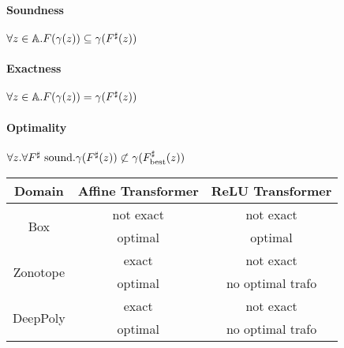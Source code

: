 \paragraph{Soundness} 
$\forall z \in \mathbb{A} . F(\gamma(z)) \subseteq \gamma(F^{\sharp}(z))$

\paragraph{Exactness}
$\forall z \in \mathbb{A} . F(\gamma(z)) = \gamma(F^{\sharp}(z))$

\paragraph{Optimality}
$\forall z . \forall F^{\sharp} ~\text{sound}. \gamma(F^{\sharp}(z)) \not\subset \gamma(F_\text{best}^{\sharp}(z))$

\centering
\begin{tabular}[t]{c|c|c}
    Domain & Affine Transformer  & ReLU Transformer \\\midrule
    \multirow{2}{*}{Box} & not exact & not exact \\
    & optimal & optimal \\\midrule
    \multirow{2}{*}{Zonotope} & exact & not exact \\
    & optimal & no optimal trafo \\\midrule
    \multirow{2}{*}{DeepPoly} & exact & not exact \\
    & optimal & no optimal trafo 
\end{tabular}
\raggedright